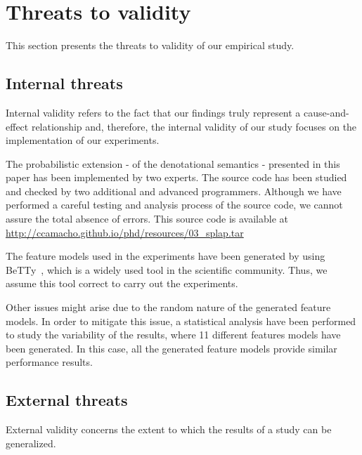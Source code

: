 \section{Threats to validity}
\label{section_threats}

This section presents the threats to validity of our empirical study.

\subsection{Internal threats}

Internal validity refers to the fact that our findings truly represent a cause-and-effect relationship and, therefore, the internal validity of our study focuses on the implementation of our experiments.

The probabilistic extension - of the denotational semantics - presented in this paper has been implemented by two experts. The source code has been studied and checked by two additional and advanced  programmers. Although we have performed a careful testing and analysis process of the source code, we cannot assure the total absence of errors. This source code is available at \url{http://ccamacho.github.io/phd/resources/03_splap.tar}

The feature models used in the experiments have been generated by using BeTTy~\cite{sg12}, which is a widely used tool in the scientific community. Thus, we assume this tool correct to carry out the experiments.

Other issues might arise due to the random nature of the generated feature models. In order to mitigate this issue, a statistical analysis have been performed to study the variability of the results, where 11 different features models have been generated. In this case, all the generated feature models provide similar performance results.

\subsection{External threats}

External validity concerns the extent to which the results of a study can be generalized.

